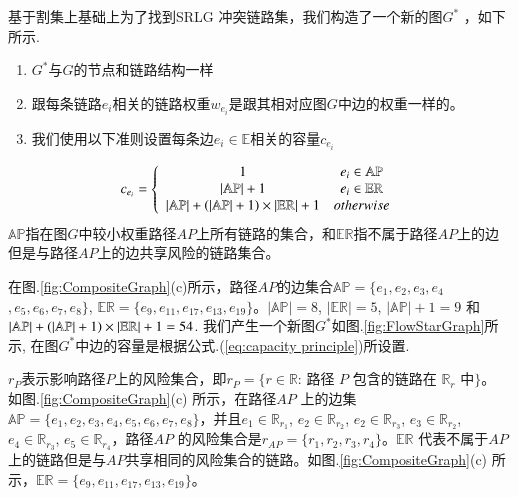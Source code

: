 基于割集上基础上为了找到SRLG 冲突链路集，我们构造了一个新的图$G^*$ ，如下所示.
\begin{enumerate}
  \item $G^*$与$G$的节点和链路结构一样
  \item 跟每条链路$e_i$相关的链路权重$w_{e_i}$是跟其相对应图$G$中边的权重一样的。
  \item 我们使用以下准则设置每条边$e_i \in \mathbb{E}$相关的容量$c_{e_i}$
\end{enumerate}
 \begin{equation}
c_{e_i} = \left\{ {\begin{array}{*{20}{c}}
   1 & {e_i{\rm{ }} \in {\rm{ \mathbb{AP}}}}  \\
   {\left| \mathbb{AP} \right|+1} & {e_i{\rm{ }} \in {\rm{ \mathbb{E}}}{{\rm{\mathbb{R}}}}}  \\
   {\left| {{\rm\mathbb{AP}}} \right| + \left( {\left| {{\rm\mathbb{AP}}} \right| + 1} \right)\times \left| {{\rm{\mathbb{E}}}{{\rm{\mathbb{R}}}}} \right| + 1} & {otherwise}  \\
\end{array}} \right.
\label{eq:capacity principle}
\end{equation}
$\mathbb{AP}$指在图$G$中较小权重路径$AP$上所有链路的集合，和$\mathbb{\mathbb{ER}}$指不属于路径$AP$上的边但是与路径$AP$上的边共享风险的链路集合。

在图.\ref{fig:CompositeGraph}(c)所示，路径$AP$的边集合$\mathbb{AP}=\{e_1,e_2,e_3,e_4$
$,e_5,e_6,e_7,e_8\}$, $\mathbb{\mathbb{ER}}=\{e_9,e_{11},e_{17},e_{13},e_{19}\}$。$|\mathbb{AP}|=8$, $|\mathbb{\mathbb{ER}}|=5$, $|\mathbb{AP}|+1=9$ 和 ${\left| {{\rm{\mathbb{AP}}}} \right| + \left( {\left| {{\rm{\mathbb{AP}}}} \right| + 1} \right)\times \left| {{\rm{\mathbb{E}}}{{\rm{\mathbb{R}}}}} \right| + 1}=54$. 我们产生一个新图$G^*$如图.\ref{fig:FlowStarGraph}所示, 在图$G^*$中边的容量是根据公式.(\ref{eq:capacity principle})所设置.

$r_P$表示影响路径$P$上的风险集合，即$r_P=\{r\in \mathbb{R}$: 路径 $P$ 包含的链路在 $\mathbb{R}_r$ 中$\}$。 如图.\ref{fig:CompositeGraph}(c) 所示，在路径$AP$ 上的边集$\mathbb{AP}=\{e_1,e_2,e_3,e_4,e_5,e_6,e_7,e_8\}$，并且$e_1\in \mathbb{R}_{r_1}$, $e_2\in \mathbb{R}_{r_2}$, $e_2\in \mathbb{R}_{r_3}$, $e_3\in \mathbb{R}_{r_2}$, $e_4\in \mathbb{R}_{r_3}$, $e_5\in \mathbb{R}_{r_4}$，路径$AP$ 的风险集合是${r}_{{AP}}=\{r_1, r_2, r_3, r_4\}$。$\mathbb{\mathbb{ER}}$ 代表不属于$AP$上的链路但是与$AP$共享相同的风险集合的链路。如图.\ref{fig:CompositeGraph}(c) 所示，$\mathbb{\mathbb{ER}}=\{e_9,e_{11},e_{17},e_{13},e_{19}\}$。

